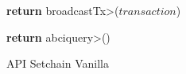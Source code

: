 \begin{figure}[t!]
  \begin{adjustbox}{minipage=[t]{\columnwidth}}
    \begin{algorithm}[H]
      \renewcommand{\thealgorithm}{API Vanilla}         
      \caption{\small API Setchain Vanilla}%
      \label{alg:api-vanilla}%
      \small
      \begin{algorithmic}[1]
            \label{alg:van_add}
                \State \textbf{return} \<broadcastTx>($transaction$)
            \EndFunction
      
            \label{alg:van_get}
                	\State \textbf{return} \<abciquery>()
            \EndFunction
            
        \end{algorithmic}
      \end{algorithm}
	\end{adjustbox}
  \end{figure}
